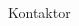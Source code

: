 \documentclass[../_main/handlingar.tex]{subfiles}
\begin{document}


\begin{signatures}{1}
    \mvh
    \signature{\sekr}{Kontaktor}
\end{signatures}
\end{document}
